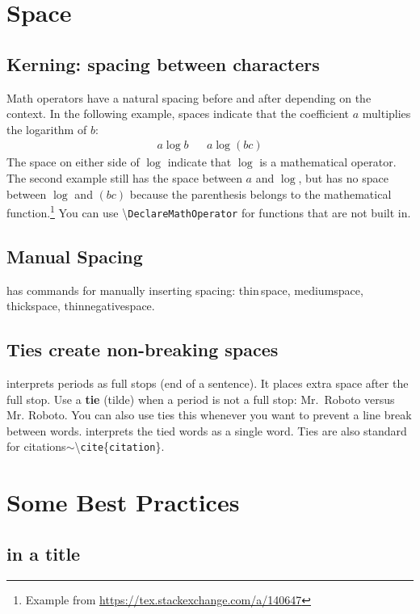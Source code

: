 \section{Space}

\subsection{Kerning: spacing between characters}
Math operators have a natural spacing before and after depending on the context. In the following example, spaces indicate that the coefficient $a$ multiplies the logarithm of $b$:
\begin{align}
	a\log b && a\log(bc)
\end{align}
The space on either side of $\log$ indicate that $\log$ is a mathematical operator. The second example still has the space between $a$ and $\log$, but has no space between $\log$ and $(bc)$ because the parenthesis belongs to the mathematical function.\footnote{Example from \url{https://tex.stackexchange.com/a/140647}}
% 
You can use \textbackslash\texttt{DeclareMathOperator} for functions that are not built in.


\subsection{Manual Spacing}

\LaTeXx has commands for manually inserting spacing: thin\,space, medium\:space, thick\;space, thin\!negative\!space.


\subsection{Ties create non-breaking spaces}

\LaTeXx interprets periods as full stops (end of a sentence). It places extra space after the full stop. Use a \textbf{tie} (tilde) when a period is not a full stop: Mr.~Roboto versus Mr. Roboto. 
% 
You can also use ties this whenever you want to prevent a line break between words. \LaTeXx interprets the tied words as a single word.
% 
Ties are also standard for citations$\sim$\textbackslash\texttt{cite}\{\texttt{citation}\}.



\section{Some Best Practices}

\subsection{\texorpdfstring{\LaTeXx in a title}{LaTeX in a title}}

